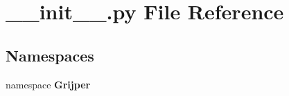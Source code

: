 \section{\-\_\-\-\_\-init\-\_\-\-\_\-.\-py File Reference}
\label{____init_____8py}
\subsection*{Namespaces}
\begin{DoxyCompactItemize}
\item 
namespace {\bf Grijper}
\end{DoxyCompactItemize}
